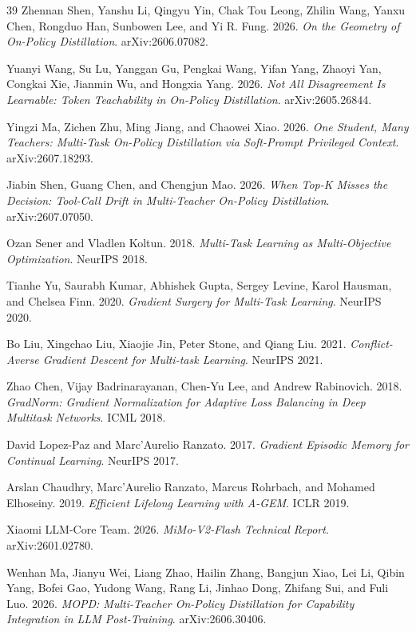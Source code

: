\documentclass{article}
\begin{document}
\begin{thebibliography}{39}
 Zhennan Shen, Yanshu Li, Qingyu Yin, Chak Tou Leong, Zhilin Wang, Yanxu Chen, Rongduo Han, Sunbowen Lee, and Yi R. Fung. 2026. \emph{On the Geometry of On-Policy Distillation}. arXiv:2606.07082.

 Yuanyi Wang, Su Lu, Yanggan Gu, Pengkai Wang, Yifan Yang, Zhaoyi Yan, Congkai Xie, Jianmin Wu, and Hongxia Yang. 2026. \emph{Not All Disagreement Is Learnable: Token Teachability in On-Policy Distillation}. arXiv:2605.26844.

 Yingzi Ma, Zichen Zhu, Ming Jiang, and Chaowei Xiao. 2026. \emph{One Student, Many Teachers: Multi-Task On-Policy Distillation via Soft-Prompt Privileged Context}. arXiv:2607.18293.

 Jiabin Shen, Guang Chen, and Chengjun Mao. 2026. \emph{When Top-K Misses the Decision: Tool-Call Drift in Multi-Teacher On-Policy Distillation}. arXiv:2607.07050.

 Ozan Sener and Vladlen Koltun. 2018. \emph{Multi-Task Learning as Multi-Objective Optimization}. NeurIPS 2018.

 Tianhe Yu, Saurabh Kumar, Abhishek Gupta, Sergey Levine, Karol Hausman, and Chelsea Finn. 2020. \emph{Gradient Surgery for Multi-Task Learning}. NeurIPS 2020.

 Bo Liu, Xingchao Liu, Xiaojie Jin, Peter Stone, and Qiang Liu. 2021. \emph{Conflict-Averse Gradient Descent for Multi-task Learning}. NeurIPS 2021.

 Zhao Chen, Vijay Badrinarayanan, Chen-Yu Lee, and Andrew Rabinovich. 2018. \emph{GradNorm: Gradient Normalization for Adaptive Loss Balancing in Deep Multitask Networks}. ICML 2018.

 David Lopez-Paz and Marc'Aurelio Ranzato. 2017. \emph{Gradient Episodic Memory for Continual Learning}. NeurIPS 2017.

 Arslan Chaudhry, Marc'Aurelio Ranzato, Marcus Rohrbach, and Mohamed Elhoseiny. 2019. \emph{Efficient Lifelong Learning with A-GEM}. ICLR 2019.

 Xiaomi LLM-Core Team. 2026. \emph{MiMo-V2-Flash Technical Report}. arXiv:2601.02780.

 Wenhan Ma, Jianyu Wei, Liang Zhao, Hailin Zhang, Bangjun Xiao, Lei Li, Qibin Yang, Bofei Gao, Yudong Wang, Rang Li, Jinhao Dong, Zhifang Sui, and Fuli Luo. 2026. \emph{MOPD: Multi-Teacher On-Policy Distillation for Capability Integration in LLM Post-Training}. arXiv:2606.30406.


\end{thebibliography}
\end{document}
